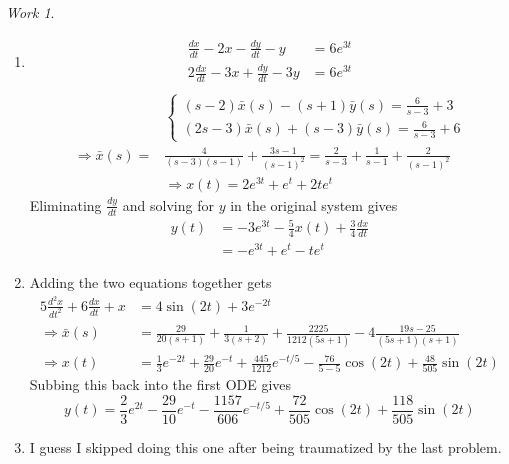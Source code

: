 \documentclass{report}
\theoremstyle{definition}
\theoremstyle{remark}
\newtheorem*{work}{Work}
\newcommand{\od}[2]{\frac{d #1}{d#2}}
\newcommand{\odt}[2]{\frac{d^2 #1}{d#2^2}}
\begin{document}
\begin{work}
    \leavevmode
    \begin{enumerate}[label=(\alph*)]
        \item \begin{equation*}
            \begin{split}
                \od{x}{t} -2x -\od{y}{t} -y&=6e^{3t} \\
                2\od{x}{t} - 3x+\od{y}{t}-3y &=6e^{3t} \\
            \end{split}
        \end{equation*}
        \begin{equation*}
            \begin{split}
                &\begin{cases}
                    \displaystyle(s-2)\bar x(s)-(s+1)\bar y(s)=\displaystyle{\frac{6}{s-3}}+3\\
                    (2s-3)\bar x(s)+(s-3)\bar y(s)=\displaystyle{\frac{6}{s-3}}+6
                \end{cases}\\
                \Rightarrow\bar x(s) = &\frac{4}{(s-3)(s-1)} +\frac{3s-1}{(s-1)^2} = \frac{2}{s-3}+\frac{1}{s-1}+\frac{2}{(s-1)^2}\\
                &\Rightarrow x(t)=2e^{3t}+e^t+2te^t
            \end{split}
        \end{equation*}
        Eliminating $\od{y}{t}$ and solving for $y$ in the original system gives 
        \begin{equation*}
            \begin{split}
                y(t)&=-3e^{3t}-\frac{5}{4}x(t)+\frac{3}{4}\od{x}{t} \\
                &=-e^{3t}+e^t-te^t
            \end{split}
        \end{equation*}
        \item Adding the two equations together gets\begin{equation*}
            \begin{split}
                5\odt{x}{t}+6\od{x}{t}+x&=4\sin (2t)+3e^{-2t} \\
                \Rightarrow \bar x(s) &=\frac{29}{20(s+1)} + \frac{1}{3(s+2)} + \frac{2225}{1212(5s+1)}-4\frac{19s-25}{(5s+1)(s+1)} \\
                \Rightarrow x(t)&=\frac{1}{3}e^{-2t}+\frac{29}{20}e^{-t}+\frac{445}{1212}e^{-t/5}-\frac{76}{5-5}\cos (2t)+\frac{48}{505}\sin(2t)
            \end{split}
        \end{equation*}
        Subbing this back into the first ODE gives \begin{equation*}
            y(t)=\frac{2}{3}e^{2t}-\frac{29}{10}e^{-t}-\frac{1157}{606}e^{-t/5}+\frac{72}{505}\cos(2t)+\frac{118}{505}\sin(2t)
        \end{equation*}
        \item I guess I skipped doing this one after being traumatized by the last problem.
    \end{enumerate}
\end{work}
\end{document}
